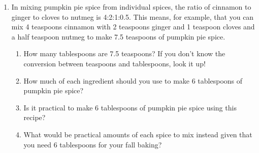 \begin{enumerate}
\begin{enumerate}
\begin{center}
\end{center}
\item In mixing pumpkin pie spice from individual spices, the ratio of cinnamon to ginger to cloves to nutmeg is 4:2:1:0.5. This means, for example, that you can mix 4 teaspoons cinnamon with 2 teaspoons ginger and 1 teaspoon cloves and a half teaspoon nutmeg to make 7.5 teaspoons of pumpkin pie spice.
\begin{enumerate}
\item How many tablespoons are 7.5 teaspoons? If you don't know the conversion between teaspoons and tablespoons, look it up! 
\item How much of each ingredient should you use to make 6 tablespoons of pumpkin pie spice? 
\item Is it practical to make 6 tablespoons of pumpkin pie spice using this recipe? 
\item What would be practical amounts of each spice to mix instead given that you need 6 tablespoons for your fall baking? 
\end{enumerate}
\end{enumerate}


\end{enumerate}

